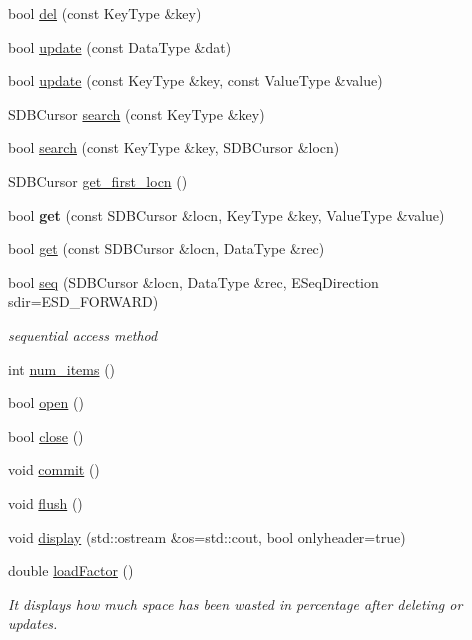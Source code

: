\begin{CompactItemize}
\item 
bool \hyperlink{classsdb__hash_a6ada730f03769b29c7c2e71d97fcd14}{del} (const KeyType \&key)
\item 
bool \hyperlink{classsdb__hash_01a9c2ad383dac61d5e6ff3e20841689}{update} (const DataType \&dat)
\item 
bool \hyperlink{classsdb__hash_d89de45c4ed1d5937fd22745e2a61f20}{update} (const KeyType \&key, const ValueType \&value)
\item 
SDBCursor \hyperlink{classsdb__hash_3594271208cb8aa10beca9f9f16fddd6}{search} (const KeyType \&key)
\item 
bool \hyperlink{classsdb__hash_c229c71b533a2d90941568e6449801db}{search} (const KeyType \&key, SDBCursor \&locn)
\item 
SDBCursor \hyperlink{classsdb__hash_18aa637624e610e99727e368f750cef5}{get\_\-first\_\-locn} ()
\item 
\hypertarget{classsdb__hash_08c49219bfad42f63c2c86f4b180959a}{
bool \textbf{get} (const SDBCursor \&locn, KeyType \&key, ValueType \&value)}
\label{classsdb__hash_08c49219bfad42f63c2c86f4b180959a}

\item 
bool \hyperlink{classsdb__hash_7e501588a5161276baff02c6812aa147}{get} (const SDBCursor \&locn, DataType \&rec)
\item 
bool \hyperlink{classsdb__hash_08fcfc39a846687aa28ecfa4f919f3bc}{seq} (SDBCursor \&locn, DataType \&rec, ESeqDirection sdir=ESD\_\-FORWARD)
\begin{CompactList}\small\item\em sequential access method \item\end{CompactList}\item 
int \hyperlink{classsdb__hash_0abd12e832bafd55d622f67497df47f9}{num\_\-items} ()
\item 
bool \hyperlink{classsdb__hash_323877d8e6fb88a7ac89ff7b361dfa5c}{open} ()
\item 
bool \hyperlink{classsdb__hash_2ebf3f46da2bfa6249badf1d1af352f2}{close} ()
\item 
void \hyperlink{classsdb__hash_23b1c9a395291fbe24416d2e1c24d364}{commit} ()
\item 
void \hyperlink{classsdb__hash_6b9f4c1147c4702b863095a324b81cfb}{flush} ()
\item 
void \hyperlink{classsdb__hash_327527c4f96ea2115450d3b2d0d2ca0d}{display} (std::ostream \&os=std::cout, bool onlyheader=true)
\item 
double \hyperlink{classsdb__hash_23fdd1400cd2c1e7f922b16a8a372924}{loadFactor} ()
\begin{CompactList}\small\item\em It displays how much space has been wasted in percentage after deleting or updates. \item\end{CompactList}\end{CompactItemize}
